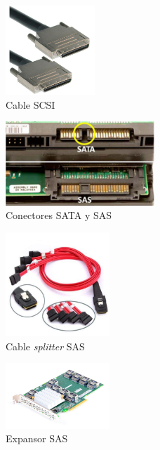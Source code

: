\documentclass[12pt,spanish]{article}
\begin{document}
\begin{figure}[H]
	\centering
	\includegraphics[width=0.3\textwidth]{scsicable.jpg}
	\caption{Cable SCSI}
\end{figure}

\begin{figure}[H]
	\centering
	\includegraphics[width=0.5\textwidth]{sasconnector.jpg}
	\caption{Conectores SATA y SAS}
\end{figure}

\begin{figure}[H]
	\centering
	\includegraphics[width=0.35\textwidth]{sassplitter.jpg}
	\caption{Cable \textit{splitter} SAS}
\end{figure}

\begin{figure}[H]
	\centering
	\includegraphics[width=0.35\textwidth]{sasexpander.jpg}
	\caption{Expansor SAS}
\end{figure}
\end{document}
